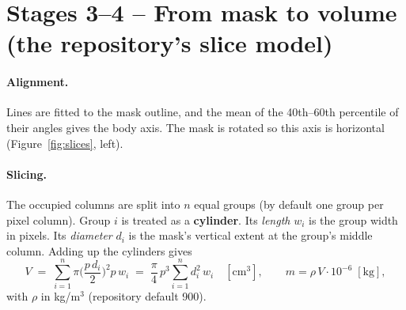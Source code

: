 \documentclass[11pt,a4paper]{article}
\begin{document}
\section{Stages 3--4 -- From mask to volume (the repository's slice model)}
\paragraph{Alignment.} Lines are fitted to the mask outline, and the mean of the 40th--60th percentile of their angles gives the body axis. The mask is rotated so this axis is horizontal (Figure~\ref{fig:slices}, left).

\paragraph{Slicing.} The occupied columns are split into $n$ equal groups (by default one group per pixel column). Group $i$ is treated as a \textbf{cylinder}. Its \emph{length} $w_i$ is the group width in pixels. Its \emph{diameter} $d_i$ is the mask's vertical extent at the group's middle column. Adding up the cylinders gives
\begin{equation}
  V \;=\; \sum_{i=1}^{n} \pi\Big(\frac{p\,d_i}{2}\Big)^{2} p\,w_i \;=\; \frac{\pi}{4}\,p^{3}\sum_{i=1}^{n} d_i^{2}\, w_i \quad[\text{cm}^3],
  \qquad m = \rho\,V\cdot 10^{-6}\;[\text{kg}],
  \label{eq:repo}
\end{equation}
with $\rho$ in kg/m$^3$ (repository default 900).
\end{document}
